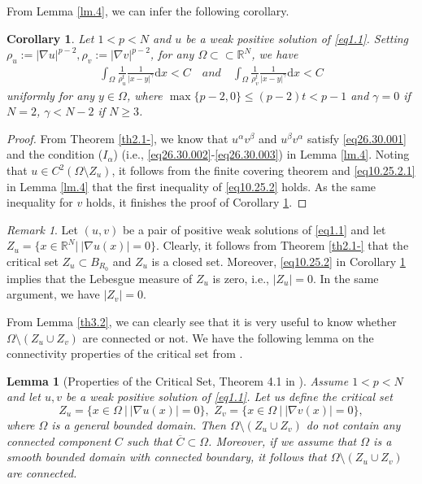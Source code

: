 \documentclass[12pt]{amsart}
\newtheorem{cor}[thm]{Corollary}
\newtheorem{lem}[thm]{Lemma}
\theoremstyle{definition}
\theoremstyle{remark}
\newtheorem{rem}[thm]{Remark}
\theoremstyle{conclusion}
\theoremstyle{conjecture}
\numberwithin{equation}{section}
\newcommand{\R}{\mathbb{R}}
\begin{document}
\smallskip

From Lemma \ref{lm.4}, we can infer the following corollary.
\begin{cor}\label{re2333}
Let $1<p<N$ and $u$ be a weak positive solution of \eqref{eq1.1}. Setting $\rho_u:=|\nabla u|^{p-2}, \rho_v:=|\nabla v|^{p-2}$, for any $\Omega \subset\subset\R^N$, we have
\begin{align}\label{eq10.25.2}
\int_{\Omega} \frac{1}{\rho_u^t} \frac{1}{|x-y|^\gamma}\mathrm{d}x < C \quad and \quad \int_{\Omega} \frac{1}{\rho_v^t} \frac{1}{|x-y|^\gamma}\mathrm{d}x < C
\end{align}
uniformly for any $y\in\Omega$, where $\max\{p-2,0\}\leq (p-2)t<p-1$ and $\gamma=0$ if $N=2$, $\gamma<N-2$ if $N \geq 3$.
\end{cor}
\begin{proof}
 From Theorem \ref{th2.1-}, we know that $u^{\alpha}v^{\beta}$ and $u^{\beta}v^{\alpha}$ satisfy \eqref{eq26.30.001} and the condition ($I_\alpha$)
 (i.e., \eqref{eq26.30.002}-\eqref{eq26.30.003}) in Lemma \ref{lm.4}. Noting that $u\in C^2(\Omega\setminus Z_u)$, it follows from the finite covering theorem and \eqref{eq10.25.2.1} in Lemma \ref{lm.4} that
the first inequality of \eqref{eq10.25.2} holds. As the same inequality  for $v$ holds, it finishes the proof of Corollary \ref{re2333}.
\end{proof}


\begin{rem}\label{re2334}
Let $(u,v)$ be a pair of positive weak solutions of \eqref{eq1.1} and let $Z_u = \{x \in \R^N|\ |\nabla u(x)| = 0 \}$. Clearly, it follows from Theorem \ref{th2.1-} that the critical set $Z_u\subset B_{R_0}$ and $Z_u$ is a closed set. Moreover, \eqref{eq10.25.2} in Corollary \ref{re2333} implies that the Lebesgue measure of $Z_{u}$ is zero, i.e., $|Z_u|=0$. In the same argument, we have $|Z_v|=0$.
\end{rem}


From Lemma \ref{th3.2}, we can clearly see that it is very useful to know whether $\Omega\setminus {\left(Z_u\cup Z_v\right)}$ are connected or not. We have the following lemma on the connectivity properties of the critical set from \cite[Theorem 4.1 and Remark 4.1]{LDBS04}.
\begin{lem}[Properties of the Critical Set, Theorem 4.1 in \cite{LDBS04}]\label{lm.7}
Assume $1<p<N$ and let $u, v$ be a  weak positive solution of \eqref{eq1.1}. Let us define the critical set
$$Z_u = \{ x\in\Omega\ | \ |\nabla u(x)|=0 \}, \,\, Z_v = \{ x\in\Omega\ | \ |\nabla v(x)|=0 \},$$
where $\Omega$ is a general bounded domain. %
Then $\Omega\setminus {\left(Z_u\cup Z_v\right)}$ do not contain any connected component $C$ such that $\overline{C} \subset \Omega$. Moreover, if we assume that $\Omega$ is a smooth bounded domain with connected boundary, it follows that $\Omega\setminus {\left(Z_u\cup Z_v\right)}$ are connected.
\end{lem}
\end{document}
